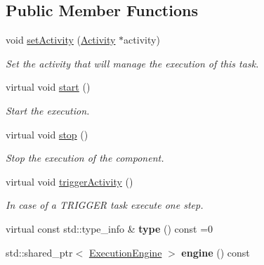 \subsection*{Public Member Functions}
\begin{DoxyCompactItemize}
\item 
\hypertarget{classcoco_1_1_task_context_a66769b9863ddc426776f67905b9cbfc2}{}void \hyperlink{classcoco_1_1_task_context_a66769b9863ddc426776f67905b9cbfc2}{set\+Activity} (\hyperlink{classcoco_1_1_activity}{Activity} $\ast$activity)\label{classcoco_1_1_task_context_a66769b9863ddc426776f67905b9cbfc2}

\begin{DoxyCompactList}\small\item\em Set the activity that will manage the execution of this task. \end{DoxyCompactList}\item 
\hypertarget{classcoco_1_1_task_context_a1e631768ca31e55c4c2605320df997fc}{}virtual void \hyperlink{classcoco_1_1_task_context_a1e631768ca31e55c4c2605320df997fc}{start} ()\label{classcoco_1_1_task_context_a1e631768ca31e55c4c2605320df997fc}

\begin{DoxyCompactList}\small\item\em Start the execution. \end{DoxyCompactList}\item 
\hypertarget{classcoco_1_1_task_context_ae8fe9cb7eec3d3f57d57cd692e781785}{}virtual void \hyperlink{classcoco_1_1_task_context_ae8fe9cb7eec3d3f57d57cd692e781785}{stop} ()\label{classcoco_1_1_task_context_ae8fe9cb7eec3d3f57d57cd692e781785}

\begin{DoxyCompactList}\small\item\em Stop the execution of the component. \end{DoxyCompactList}\item 
\hypertarget{classcoco_1_1_task_context_a72a5550fc3d0ceba03f8b091852d71f6}{}virtual void \hyperlink{classcoco_1_1_task_context_a72a5550fc3d0ceba03f8b091852d71f6}{trigger\+Activity} ()\label{classcoco_1_1_task_context_a72a5550fc3d0ceba03f8b091852d71f6}

\begin{DoxyCompactList}\small\item\em In case of a T\+R\+I\+G\+G\+E\+R task execute one step. \end{DoxyCompactList}\item 
\hypertarget{classcoco_1_1_task_context_a66ec10f5b0f28a717cdc9c76110441fd}{}virtual const std\+::type\+\_\+info \& {\bfseries type} () const =0\label{classcoco_1_1_task_context_a66ec10f5b0f28a717cdc9c76110441fd}

\item 
\hypertarget{classcoco_1_1_task_context_a7d7947be2c6466cbae938958bf147c5a}{}std\+::shared\+\_\+ptr$<$ \hyperlink{classcoco_1_1_execution_engine}{Execution\+Engine} $>$ {\bfseries engine} () const \label{classcoco_1_1_task_context_a7d7947be2c6466cbae938958bf147c5a}

\end{DoxyCompactItemize}
